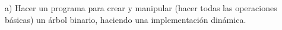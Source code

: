a) Hacer un programa para crear y manipular (hacer todas
las operaciones básicas) un árbol binario, haciendo una
implementación dinámica.
